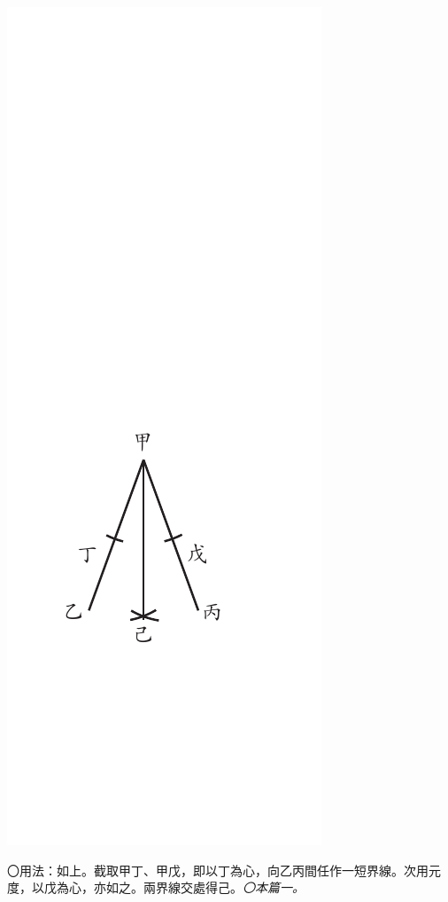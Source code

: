 \documentclass[12pt,b5paper,landscape]{article}
\newcommand{\ccom}[1]{{\footnotesize \emph{〇#1}}}
\newcommand{\bcom}[1]{〇#1}
\begin{document}
\begin{multicols}{2}
\begin{center}
\includegraphics[angle=90]{eu47}
\end{center}
\bcom{用法：如上。截取甲丁、甲戊，即以丁為心，向乙丙間任作一短界線。次用元度，以戊為心，亦如之。兩界線交處得己。\ccom{本篇一。}}


\end{multicols}
\end{document}
